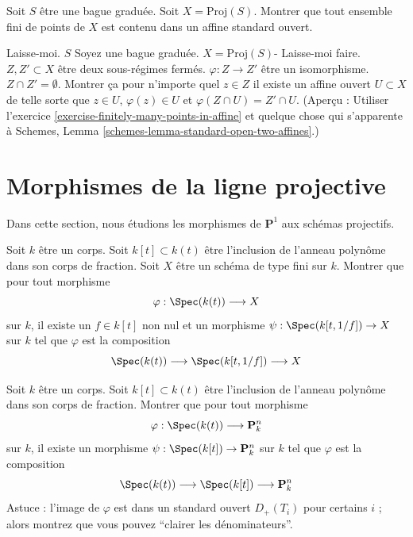 \begin{exercise}
\label{exercise-finitely-many-points-in-affine}
Soit $S$ être une bague
graduée. Soit $X = \text{Proj}(S)$.
Montrer que tout ensemble fini de points de $X$ est contenu dans un affine
standard ouvert.
\end{exercise}

\begin{exercise}
\label{exercise-prepare-glueing}
Laisse-moi. $S$ Soyez une
bague graduée. $X = \text{Proj}(S)$-
Laisse-moi faire. $Z, Z' \subset X$ être deux
sous-régimes fermés. $\varphi : Z \to Z'$
être un isomorphisme. $Z \cap Z'
= \emptyset$. Montrer ça pour n'importe quel $z
\in Z$ il existe un affine ouvert $U \subset X$ de
telle sorte que $z \in
U$, $\varphi(z) \in U$ et $\varphi(Z \cap U) = Z' \cap U$.
(Aperçu : Utiliser
l'exercice \ref{exercise-finitely-many-points-in-affine} et quelque chose qui s'apparente à Schemes, Lemma \ref{schemes-lemma-standard-open-two-affines}.)
\end{exercise}







\section{Morphismes de la ligne projective}
\label{section-from-P1}

\noindent
Dans cette section, nous étudions les morphismes de $\mathbf{P}^1$
aux schémas projectifs.

\begin{exercise}
\label{exercise-from-generic-point}
Soit $k$ être un corps. Soit $k[t] \subset k(t)$ être
l'inclusion de l'anneau polynôme dans son corps de fraction. Soit $X$
être un schéma de type fini sur $k$.
Montrer que pour tout morphisme
$$
\varphi : \Spec(k(t)) \longrightarrow X
$$
sur $k$, il existe un $f \in k[t]$ non nul et un
morphisme $\psi : \Spec(k[t, 1/f]) \to X$ sur
$k$ tel que $\varphi$ est la composition
$$
\Spec(k(t)) \longrightarrow \Spec(k[t, 1/f]) \longrightarrow X
$$
\end{exercise}

\begin{exercise}
\label{exercise-from-generic-point-Pn}
Soit $k$ être un corps. Soit $k[t] \subset k(t)$
être l'inclusion de l'anneau polynôme dans son corps de fraction.
Montrer que pour tout morphisme
$$
\varphi : \Spec(k(t)) \longrightarrow \mathbf{P}^n_k
$$
sur $k$, il existe un morphisme $\psi : \Spec(k[t]) \to \mathbf{P}^n_k$ sur
$k$ tel que $\varphi$ est la composition
$$
\Spec(k(t)) \longrightarrow \Spec(k[t]) \longrightarrow \mathbf{P}^n_k
$$
Astuce : l'image de $\varphi$ est dans un standard ouvert $D_+(T_i)$ pour
certains $i$ ; alors montrez que vous pouvez ``clairer les dénominateurs''.
\end{exercise}

